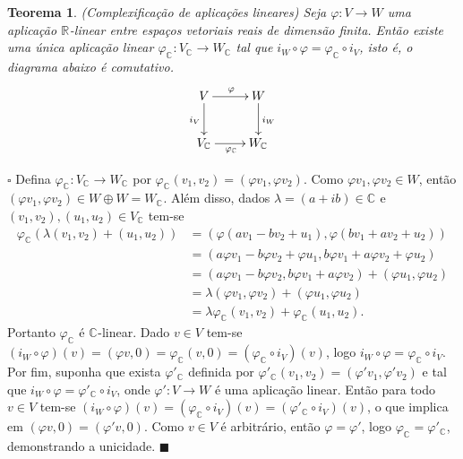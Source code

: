 \documentclass[12pt]{book}
\newtheorem{teorema}{Teorema}[section]
\newenvironment{prova}[1]{$\square$ #1}{\hfill$\blacksquare$}
\newcommand{\complexificacao}[1]{#1_{\complexo{}}}
\newcommand{\complexo}[1]{\mathbb{C}^{#1}}
\newcommand{\real}[1]{\mathbb{R}^{#1}}
\newcommand{\reta}{\real{}}
\begin{document}
	\begin{teorema}
		(Complexificação de aplicações lineares) Seja $\varphi : V \to W$ uma aplicação
		$\reta$-linear entre espaços vetoriais reais de dimensão finita. Então existe uma única aplicação linear $\complexificacao{\varphi}:\complexificacao{V} \to \complexificacao{W}$ tal que $i_{W}\circ \varphi = \complexificacao{\varphi} \circ i_{V}$, isto é, o diagrama abaixo é comutativo.
		$$
		\xymatrix{
			V\ar[d]_{i_{V}}\ar[r]^{\varphi} & W\ar[d]^{i_{W}} 
			\\
			\complexificacao{V} \ar[r]_{\complexificacao{\varphi}}&\complexificacao{W} 
		}
		$$
	\end{teorema}
	\begin{prova}
		Defina $\complexificacao{\varphi}:\complexificacao{V} \to \complexificacao{W}$ por $\complexificacao{\varphi}(v_{1}, v_{2}) = (\varphi v_{1}, \varphi v_{2})$. Como $\varphi v_{1}, \varphi v_{2} \in W$, então $(\varphi v_{1}, \varphi v_{2}) \in W\oplus W = \complexificacao{W}$. Além disso, dados $\lambda = (a+ib)\in \complexo{}$ e $(v_{1}, v_{2}), (u_{1}, u_{2})\in \complexificacao{V}$ tem-se 
		$$
		\begin{aligned}
		\complexificacao{\varphi} (\lambda(v_{1}, v_{2}) + (u_{1}, u_{2})) 
		&= (\varphi(a v_{1} - bv_{2} + u_{1}), \varphi(b v_{1}+a v_{2} + u_{2}))
		\\
		&=(a\varphi v_{1} - b\varphi v_{2} + \varphi u_{1}, b\varphi v_{1}+a\varphi v_{2} + \varphi u_{2})
		\\
		&=(a\varphi v_{1} - b\varphi v_{2} , b\varphi v_{1}+a\varphi v_{2} )+(\varphi u_{1},\varphi u_{2})
		\\
		&=\lambda(\varphi v_{1},\varphi v_{2})+(\varphi u_{1},\varphi u_{2})
		\\
		&=\lambda 	\complexificacao{\varphi} (v_{1},v_{2})+\complexificacao{\varphi} (u_{1},u_{2}).
		\end{aligned}
		$$
		Portanto $\complexificacao{\varphi}$ é $\complexo{}$-linear. Dado $v \in V$ tem-se $(i_{W}\circ \varphi)(v) = (\varphi v,0) = \complexificacao{\varphi}(v,0) = (\complexificacao{\varphi} \circ i_{V})(v)$, logo $i_{W}\circ \varphi =\complexificacao{\varphi} \circ i_{V}$. Por fim, suponha que exista $\complexificacao{\varphi'} $ definida por $\complexificacao{\varphi'}(v_{1}, v_{2}) = (\varphi' v_{1}, \varphi' v_{2})$ e tal que $i_{W}\circ \varphi =\complexificacao{\varphi'} \circ i_{V}$, onde $\varphi':V\to W$ é uma aplicação linear. Então para todo $v \in V$ tem-se $(i_{W}\circ \varphi )(v)=(\complexificacao{\varphi} \circ i_{V})(v) = (\complexificacao{\varphi'} \circ i_{V})(v)$, o que implica em $(\varphi v, 0) = (\varphi' v, 0)$. Como $v \in V$ é arbitrário, então $\varphi = \varphi'$, logo $\complexificacao{\varphi} = \complexificacao{\varphi'}$, demonstrando a unicidade. 
	\end{prova}
	
\end{document}
